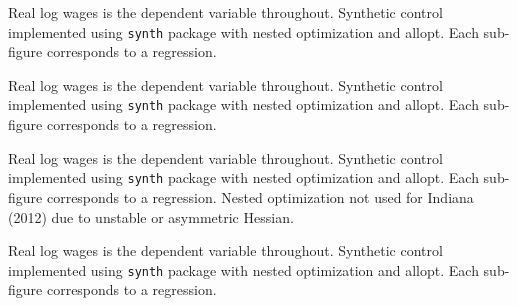\documentclass[11pt]{article}
\begin{document}
{\pagebreak
\small{}
\footnotesize{Real log wages is the dependent variable throughout. Synthetic control implemented using \texttt{synth} package with nested optimization and allopt. Each sub-figure corresponds to a regression.}

\pagebreak
\small{}
\footnotesize{Real log wages is the dependent variable throughout. Synthetic control implemented using \texttt{synth} package with nested optimization and allopt. Each sub-figure corresponds to a regression.}

\pagebreak
\small{}
\footnotesize{Real log wages is the dependent variable throughout. Synthetic control implemented using \texttt{synth} package with nested optimization and allopt. Each sub-figure corresponds to a regression. Nested optimization not used for Indiana (2012) due to unstable or asymmetric Hessian.}

\pagebreak
\small{}
\footnotesize{Real log wages is the dependent variable throughout. Synthetic control implemented using \texttt{synth} package with nested optimization and allopt. Each sub-figure corresponds to a regression.}

}
\end{document}
